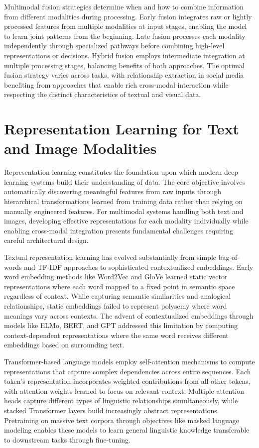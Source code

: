 \documentclass[12pt,a4paper]{report}
\begin{document}
Multimodal fusion strategies determine when and how to combine information from different modalities during processing. Early fusion integrates raw or lightly processed features from multiple modalities at input stages, enabling the model to learn joint patterns from the beginning. Late fusion processes each modality independently through specialized pathways before combining high-level representations or decisions. Hybrid fusion employs intermediate integration at multiple processing stages, balancing benefits of both approaches. The optimal fusion strategy varies across tasks, with relationship extraction in social media benefiting from approaches that enable rich cross-modal interaction while respecting the distinct characteristics of textual and visual data.

\section{Representation Learning for Text and Image Modalities}

Representation learning constitutes the foundation upon which modern deep learning systems build their understanding of data. The core objective involves automatically discovering meaningful features from raw inputs through hierarchical transformations learned from training data rather than relying on manually engineered features. For multimodal systems handling both text and images, developing effective representations for each modality individually while enabling cross-modal integration presents fundamental challenges requiring careful architectural design.

Textual representation learning has evolved substantially from simple bag-of-words and TF-IDF approaches to sophisticated contextualized embeddings. Early word embedding methods like Word2Vec and GloVe learned static vector representations where each word mapped to a fixed point in semantic space regardless of context. While capturing semantic similarities and analogical relationships, static embeddings failed to represent polysemy where word meanings vary across contexts. The advent of contextualized embeddings through models like ELMo, BERT, and GPT addressed this limitation by computing context-dependent representations where the same word receives different embeddings based on surrounding text.

Transformer-based language models employ self-attention mechanisms to compute representations that capture complex dependencies across entire sequences. Each token's representation incorporates weighted contributions from all other tokens, with attention weights learned to focus on relevant context. Multiple attention heads capture different types of linguistic relationships simultaneously, while stacked Transformer layers build increasingly abstract representations. Pretraining on massive text corpora through objectives like masked language modeling enables these models to learn general linguistic knowledge transferable to downstream tasks through fine-tuning.
\end{document}
